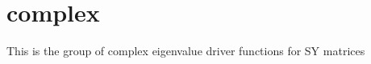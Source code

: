 \hypertarget{group__complexSYeigen}{}\section{complex}
\label{group__complexSYeigen}
This is the group of complex eigenvalue driver functions for S\+Y matrices 
